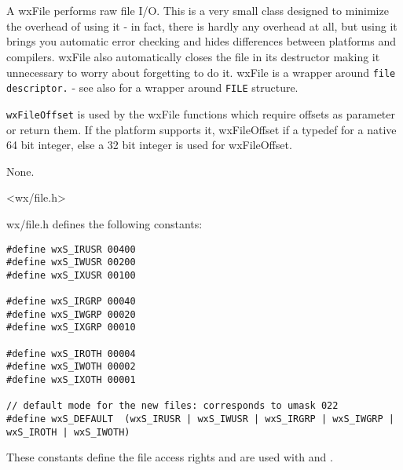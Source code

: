 
\section{}\label{wxfile}

A wxFile performs raw file I/O. This is a very small class designed to
minimize the overhead of using it - in fact, there is hardly any overhead at
all, but using it brings you automatic error checking and hides differences
between platforms and compilers. wxFile also automatically closes the file in
its destructor making it unnecessary to worry about forgetting to do it.
wxFile is a wrapper around {\tt file descriptor.} - see also 
 for a wrapper around {\tt FILE} structure.

{\tt wxFileOffset} is used by the wxFile functions which require offsets as 
parameter or return them. If the platform supports it, wxFileOffset if a typedef
for a native 64 bit integer, else a 32 bit integer is used for wxFileOffset.


None.


<wx/file.h>


wx/file.h defines the following constants:

\begin{verbatim}
#define wxS_IRUSR 00400
#define wxS_IWUSR 00200
#define wxS_IXUSR 00100

#define wxS_IRGRP 00040
#define wxS_IWGRP 00020
#define wxS_IXGRP 00010

#define wxS_IROTH 00004
#define wxS_IWOTH 00002
#define wxS_IXOTH 00001

// default mode for the new files: corresponds to umask 022
#define wxS_DEFAULT  (wxS_IRUSR | wxS_IWUSR | wxS_IRGRP | wxS_IWGRP | wxS_IROTH | wxS_IWOTH)
\end{verbatim}

These constants define the file access rights and are used with 
 and .


